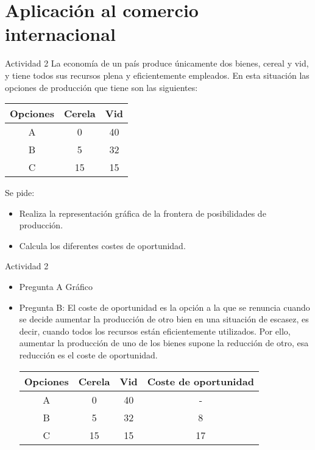 \section[Comercio internacional]{Aplicación al comercio internacional}

\begin{frame}{Actividad 2}
	La economía de un país produce únicamente dos bienes, cereal y vid, y tiene todos sus recursos plena y eficientemente empleados. En esta situación las opciones de producción que tiene son las siguientes:\\
		\begin{center}
			\begin{tabular}{ccc}
					\hline
				Opciones & Cerela & Vid \\
					\hline
				A & 0 & 40 \\
				B & 5 & 32 \\
				C & 15 & 15 \\
					\hline
			\end{tabular}
		\end{center}
	Se pide:
		\begin{itemize}
			\item Realiza la representación gráfica de la frontera de posibilidades de producción.
			\item Calcula los diferentes costes de oportunidad.
		\end{itemize}
\end{frame}
\begin{frame}{Actividad 2}
	\begin{itemize}
		\item Pregunta A Gráfico
		\item Pregunta B: 
				El coste de oportunidad es la opción a la que se renuncia cuando se decide aumentar la producción de otro bien en una situación de escasez, es decir, cuando todos los recursos están eficientemente utilizados. Por ello, aumentar la producción de uno de los bienes supone la reducción de otro, esa reducción es el coste de oportunidad.
					\begin{center}
						\begin{tabular}{cccc}
							\hline
							Opciones & Cerela & Vid & Coste de oportunidad\\
							\hline
							A & 0  & 40 & - \\
							B & 5  & 32 & 8 \\
							C & 15 & 15 & 17 \\
							\hline
						\end{tabular}
					\end{center}
	\end{itemize}
\end{frame}